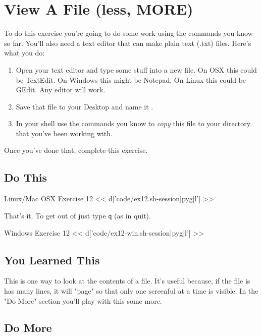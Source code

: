 \chapter{View A File (less, MORE)}

To do this exercise you're going to do some work using the commands you know so far.
You'll also need a text editor that can make plain text (.txt) files.  Here's
what you do:

\begin{enumerate}
\item Open your text editor and type some stuff into a new file. On OSX this could be TextEdit.  On Windows this might be Notepad.  On Linux this could be GEdit.  Any editor will work.
\item Save that file to your Desktop and name it .
\item In your shell use the commands you know to \emph{copy} this file
    to your  directory that you've been working with.
\end{enumerate}

Once you've done that, complete this exercise.

\section{Do This}

\begin{code}{Linux/Mac OSX Exercise 12}
<< d['code/ex12.sh-session|pyg|l'] >>
\end{code}

That's it. To get out of  just type \verb|q| (as in quit).

\begin{code}{Windows Exercise 12}
<< d['code/ex12-win.sh-session|pyg|l'] >>
\end{code}

\section{You Learned This}

This is one way to look at the contents of a file.  It's useful because, if the
file is has many lines, it will "page" so that only one screenful at a time
is visible.  In the "Do More" section you'll play with this some more.


\section{Do More}

